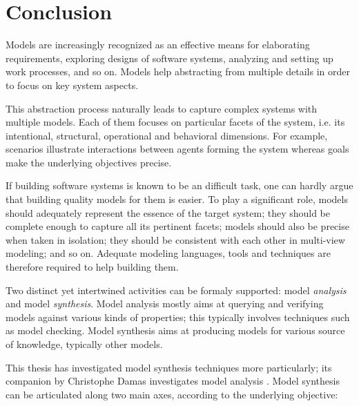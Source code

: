 \chapter{Conclusion\label{chapter:conclusion}}

Models are increasingly recognized as an effective means for elaborating requirements, exploring designs of software systems, analyzing and setting up work processes, and so on. Models help abstracting from multiple details in order to focus on key system aspects.

This abstraction process naturally leads to capture complex systems with multiple models. Each of them focuses on particular facets of the system, i.e. its intentional, structural, operational and behavioral dimensions. For example, scenarios illustrate interactions between agents forming the system whereas goals make the underlying objectives precise.

If building software systems is known to be an difficult task, one can hardly argue that building quality models for them is easier. To play a significant role, models should adequately represent the essence of the target system; they should be complete enough to capture all its pertinent facets; models should also be precise when taken in isolation; they should be consistent with each other in multi-view modeling; and so on. Adequate modeling languages, tools and techniques are therefore required to help building them.

Two distinct yet intertwined activities can be formaly supported: model \emph{analysis} and model \emph{synthesis}. Model analysis mostly aims at querying and verifying models against various kinds of properties; this typically involves techniques such as model checking. Model synthesis aims at producing models for various source of knowledge, typically other models.

This thesis has investigated model synthesis techniques more particularly; its companion by Christophe Damas investigates model analysis \cite{Damas:2011}. Model synthesis can be articulated along two main axes, according to the underlying objective:

